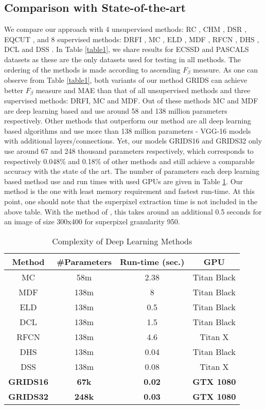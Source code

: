 \documentclass[a4paper,conference]{IEEEtran}
\begin{document}
\subsection{Comparison with State-of-the-art}
We compare our approach with 4 unsupervised methods: RC \cite{Cheng1}, CHM \cite{Li3}, DSR \cite{Li2}, EQCUT \cite{Aytekin2}, and 8 supervised methods: DRFI \cite{Jiang}, MC \cite{Zhao}, ELD \cite{Gayoung}, MDF \cite{Li4}, RFCN \cite{Wang}, DHS \cite{Liu2}, DCL \cite{Li5} and DSS \cite{Hou}.
In Table \ref{table1}, we share results for ECSSD and PASCALS datasets as these are the only datasets used for testing in all methods.
The ordering of the methods is made according to ascending $F_\beta$ measure.
As one can observe from Table \ref{table1}, both variants of our method GRIDS can achieve better $F_\beta$ measure and MAE than that of all unsupervised methods and three supervised methods: DRFI, MC and MDF.
Out of these methods MC and MDF are deep learning based and use around 58 and 138 million parameters respectively.
Other methods that outperform our method are all deep learning based algorithms and use more than 138 million parameters - VGG-16 models with additional layers/connections.
Yet, our models GRIDS16 and GRIDS32 only use around 67 and 248 thousand parameters respectively, which corresponds to respectively 0.048\% and 0.18\% of other methods and still achieve a comparable accuracy with the state of the art.
The number of parameters each deep learning based method use and run times with used GPUs are given in Table \ref{table2}.
Our method is the one with least memory requirement and fastest run-time.
At this point, one should note that the superpixel extraction time is not included in the above table. With the method of \cite{Fu}, this takes around an additional 0.5 seconds for an image of size 300x400 for superpixel granularity 950.


\begin{table}[!t]
\renewcommand{\arraystretch}{1.3}

\caption{Complexity of Deep Learning Methods}
\label{table2}
\centering
\begin{tabular}{|c||c||c||c|}
\hline
Method & \#Parameters & Run-time (sec.) & GPU\\
\hline
MC & 58m & 2.38 & Titan Black\\\hline
MDF & 138m & 8 & Titan Black\\\hline
ELD & 138m & 0.5 & Titan Black\\\hline
DCL & 138m & 1.5 & Titan Black\\\hline
RFCN & 138m & 4.6 & Titan X\\\hline
DHS & 138m & 0.04 & Titan Black\\\hline
DSS & 138m & 0.08 & Titan X\\\hline
\textbf{GRIDS16} & \textbf{67k} & \textbf{0.02} & \textbf{GTX 1080}\\\hline
\textbf{GRIDS32} & \textbf{248k} & \textbf{0.03} & \textbf{GTX 1080}\\\hline

\end{tabular}
\end{table}
\end{document}
